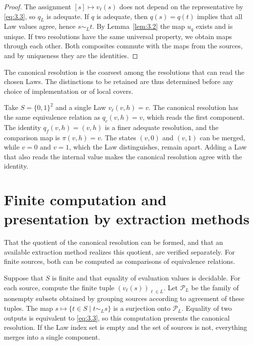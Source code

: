 \begin{proof}

The assignment $[s]\mapsto v_\ell(s)$ does not depend on the representative by
\eqref{eq:3.3}, so $q_L$ is adequate. If $q$ is adequate, then $q(s)=q(t)$ implies
that all Law values agree, hence $s\sim_L t$. By Lemma~\ref{lem:3.2} the map $u_q$
exists and is unique. If two resolutions have the same universal property, we obtain
maps through each other. Both composites commute with the maps from the sources, and
by uniqueness they are the identities.

\end{proof}

The canonical resolution is the coarsest among the resolutions that can read the
chosen Laws. The distinctions to be retained are thus determined before any choice of
implementation or of local covers.

\begin{example}\label{ex:3.5}

Take $S=\{0,1\}^2$ and a single Law $v_\ell(v,h)=v$.
The canonical resolution has the same equivalence relation as $q_c(v,h)=v$, which
reads the first component. The identity $q_f(v,h)=(v,h)$ is a finer adequate
resolution, and the comparison map is $\pi(v,h)=v$.
The states $(v,0)$ and $(v,1)$ can be merged, while $v=0$ and $v=1$, which the Law
distinguishes, remain apart. Adding a Law that also reads the internal value makes the
canonical resolution agree with the identity.

\end{example}

\section{Finite computation and presentation by extraction methods}\label{sec:3.2}

That the quotient of the canonical resolution can be formed, and that an available
extraction method realizes this quotient, are verified separately. For finite sources,
both can be computed as comparisons of equivalence relations.

\begin{construction}\label{cons:3.6}

Suppose that $S$ is finite and that equality of evaluation values is decidable.
For each source, compute the finite tuple $(v_\ell(s))_{\ell\in L}$.
Let $\mathcal{P}_L$ be the family of nonempty subsets obtained by grouping sources
according to agreement of these tuples.
The map $s\mapsto\{t\in S\mid t\sim_L s\}$ is a surjection onto $\mathcal{P}_L$.
Equality of two outputs is equivalent to \eqref{eq:3.3}, so this computation presents
the canonical resolution. If the Law index set is empty and the set of sources is not,
everything merges into a single component.

\end{construction}

